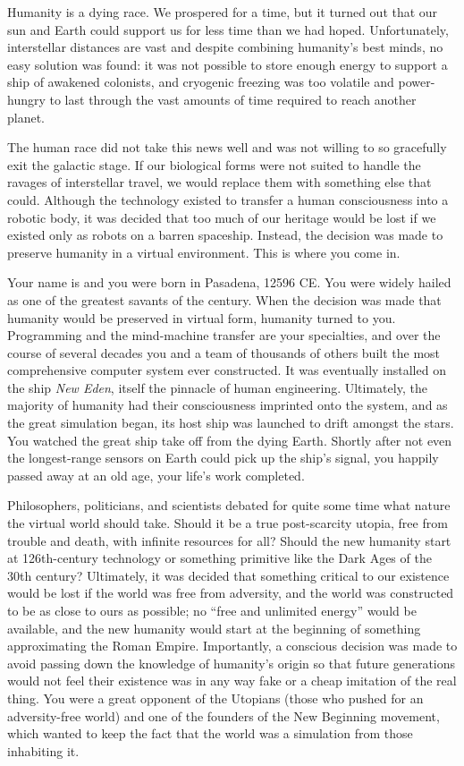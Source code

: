 \documentclass[char]{guildcamp1}
\begin{document}
\name{\cProgrammer{}}

Humanity is a dying race. We prospered for a time, but it turned out that our sun and Earth could support us for less time than we had hoped. Unfortunately, interstellar distances are vast and despite combining humanity's best minds, no easy solution was found: it was not possible to store enough energy to support a ship of awakened colonists, and cryogenic freezing was too volatile and power-hungry to last through the vast amounts of time required to reach another planet.

The human race did not take this news well and was not willing to so gracefully exit the galactic stage. If our biological forms were not suited to handle the ravages of interstellar travel, we would replace them with something else that could. Although the technology existed to transfer a human consciousness into a robotic body, it was decided that too much of our heritage would be lost if we existed only as robots on a barren spaceship. Instead, the decision was made to preserve humanity in a virtual environment. This is where you come in.

Your name is \cProgrammer{\they} and you were born in Pasadena, 12596 CE. You were widely hailed as one of the greatest savants of the century. When the decision was made that humanity would be preserved in virtual form, humanity turned to you. Programming and the mind-machine transfer are your specialties, and over the course of several decades you and a team of thousands of others built the most comprehensive computer system ever constructed. It was eventually installed on the ship \emph{New Eden}, itself the pinnacle of human engineering. Ultimately, the majority of humanity had their consciousness imprinted onto the system, and as the great simulation began, its host ship was launched to drift amongst the stars. You watched the great ship take off from the dying Earth. Shortly after not even the longest-range sensors on Earth could pick up the ship's signal, you happily passed away at an old age, your life's work completed.

Philosophers, politicians, and scientists debated for quite some time what nature the virtual world should take. Should it be a true post-scarcity utopia, free from trouble and death, with infinite resources for all? Should the new humanity start at 126th-century technology or something primitive like the Dark Ages of the 30th century? Ultimately,  it was decided that something critical to our existence would be lost if the world was free from adversity, and the world was constructed to be as close to ours as possible; no ``free and unlimited energy'' would be available, and the new humanity would start at the beginning of something approximating the Roman Empire. Importantly, a conscious decision was made to avoid passing down the knowledge of humanity's origin so that future generations would not feel their existence was in any way fake or a cheap imitation of the real thing. You were a great opponent of the Utopians (those who pushed for an adversity-free world) and one of the founders of the New Beginning movement, which wanted to keep the fact that the world was a simulation from those inhabiting it.
\end{document}
